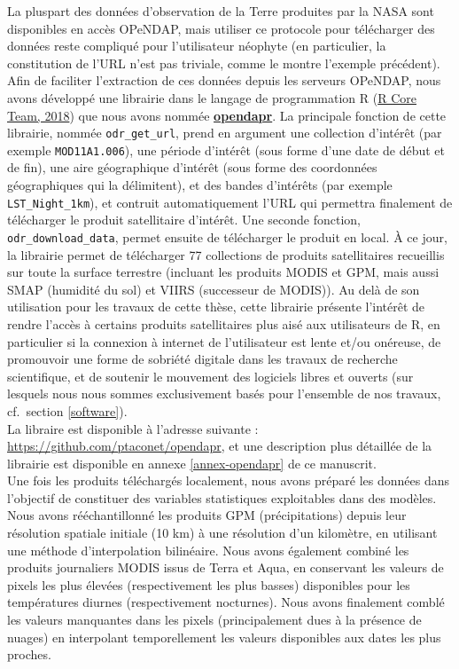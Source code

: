 \documentclass[12pt,twoside]{reedthesis}
\begin{document}
La pluspart des données d'observation de la Terre produites par la NASA sont disponibles en accès OPeNDAP, mais utiliser ce protocole pour télécharger des données reste compliqué pour l'utilisateur néophyte (en particulier, la constitution de l'URL n'est pas triviale, comme le montre l'exemple précédent). Afin de faciliter l'extraction de ces données depuis les serveurs OPeNDAP, nous avons développé une librairie dans le langage de programmation R (\protect\hyperlink{ref-r_core_team_r_2018}{R Core Team, 2018}) que nous avons nommée \href{https://github.com/ptaconet/opendapr}{\textbf{opendapr}}. La principale fonction de cette librairie, nommée \texttt{odr\_get\_url}, prend en argument une collection d'intérêt (par exemple \texttt{MOD11A1.006}), une période d'intérêt (sous forme d'une date de début et de fin), une aire géographique d'intérêt (sous forme des coordonnées géographiques qui la délimitent), et des bandes d'intérêts (par exemple \texttt{LST\_Night\_1km}), et contruit automatiquement l'URL qui permettra finalement de télécharger le produit satellitaire d'intérêt. Une seconde fonction, \texttt{odr\_download\_data}, permet ensuite de télécharger le produit en local. À ce jour, la librairie permet de télécharger 77 collections de produits satellitaires recueillis sur toute la surface terrestre (incluant les produits MODIS et GPM, mais aussi SMAP (humidité du sol) et VIIRS (successeur de MODIS)). Au delà de son utilisation pour les travaux de cette thèse, cette librairie présente l'intérêt de rendre l'accès à certains produits satellitaires plus aisé aux utilisateurs de R, en particulier si la connexion à internet de l'utilisateur est lente et/ou onéreuse, de promouvoir une forme de sobriété digitale dans les travaux de recherche scientifique, et de soutenir le mouvement des logiciels libres et ouverts (sur lesquels nous nous sommes exclusivement basés pour l'ensemble de nos travaux, cf.~section \ref{software}).\\

La libraire est disponible à l'adresse suivante : \url{https://github.com/ptaconet/opendapr}, et une description plus détaillée de la librairie est disponible en annexe \ref{annex-opendapr} de ce manuscrit.\\

Une fois les produits téléchargés localement, nous avons préparé les données dans l'objectif de constituer des variables statistiques exploitables dans des modèles. Nous avons rééchantillonné les produits GPM (précipitations) depuis leur résolution spatiale initiale (10 km) à une résolution d'un kilomètre, en utilisant une méthode d'interpolation bilinéaire. Nous avons également combiné les produits journaliers MODIS issus de Terra et Aqua, en conservant les valeurs de pixels les plus élevées (respectivement les plus basses) disponibles pour les températures diurnes (respectivement nocturnes). Nous avons finalement comblé les valeurs manquantes dans les pixels (principalement dues à la présence de nuages) en interpolant temporellement les valeurs disponibles aux dates les plus proches.\\
\end{document}
